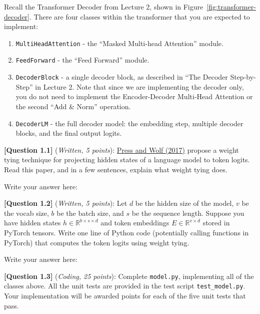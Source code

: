 \documentclass[leqno,12pt]{article}
\begin{document}
Recall the Transformer Decoder from Lecture 2, shown in Figure~\ref{fig:transformer-decoder}.
There are four classes within the transformer that you are expected to implement:
\begin{enumerate}
    \item \texttt{MultiHeadAttention} - the ``Masked Multi-head Attention'' module.
    \item \texttt{FeedForward} - the ``Feed Forward'' module.
    \item \texttt{DecoderBlock} - a single decoder block, as described in ``The Decoder Step-by-Step'' in Lecture 2. Note that since we are implementing the decoder only, you do not need to implement the Encoder-Decoder Multi-Head Attention or the second ``Add \& Norm'' operation. 
    \item \texttt{DecoderLM} - the full decoder model: the embedding step, multiple decoder blocks, and the final output logits.
\end{enumerate}

\noindent \textbf{[Question 1.1]} (\emph{Written, 5 points}): \href{https://aclanthology.org/E17-2025/}{Press and Wolf (2017)} propose a weight tying technique for projecting hidden states of a language model to token logits. Read this paper, and in a few sentences, explain what weight tying does.
\newline

\noindent Write your answer here:
\begin{tcolorbox}[fit,height=2cm, width=\linewidth, blank, borderline={1pt}{-2pt}]
\end{tcolorbox}

\noindent \textbf{[Question 1.2]} (\emph{Written, 5 points}): Let $d$ be the hidden size of the model, $v$ be the vocab size, $b$ be the batch size, and $s$ be the sequence length. Suppose you have hidden states $h \in \mathbb{R}^{b \times s \times d}$ and token embeddings $E \in \mathbb{R}^{v \times d}$ stored in PyTorch tensors. Write one line of Python code (potentially calling functions in PyTorch) that computes the token logits using weight tying.
\newline

\noindent
Write your answer here:
\begin{tcolorbox}[fit,height=2cm, width=\linewidth, blank, borderline={1pt}{-2pt}]
\end{tcolorbox}

\noindent \textbf{[Question 1.3]} (\emph{Coding, 25 points}): Complete \texttt{model.py}, implementing all of the classes above. All the unit tests are provided in the test script \texttt{test\_model.py}. Your implementation will be awarded points for each of the five unit tests that pass.
\newline
\end{document}
